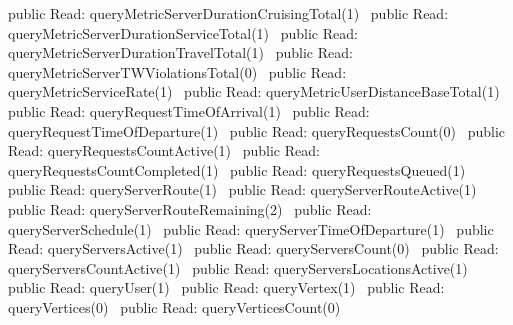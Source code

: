 public \LA{}Read: queryMetricServerDurationCruisingTotal(1)~{\nwtagstyle{}}\RA{}
public \LA{}Read: queryMetricServerDurationServiceTotal(1)~{\nwtagstyle{}}\RA{}
public \LA{}Read: queryMetricServerDurationTravelTotal(1)~{\nwtagstyle{}}\RA{}
public \LA{}Read: queryMetricServerTWViolationsTotal(0)~{\nwtagstyle{}}\RA{}
public \LA{}Read: queryMetricServiceRate(1)~{\nwtagstyle{}}\RA{}
public \LA{}Read: queryMetricUserDistanceBaseTotal(1)~{\nwtagstyle{}}\RA{}
public \LA{}Read: queryRequestTimeOfArrival(1)~{\nwtagstyle{}}\RA{}
public \LA{}Read: queryRequestTimeOfDeparture(1)~{\nwtagstyle{}}\RA{}
public \LA{}Read: queryRequestsCount(0)~{\nwtagstyle{}}\RA{}
public \LA{}Read: queryRequestsCountActive(1)~{\nwtagstyle{}}\RA{}
public \LA{}Read: queryRequestsCountCompleted(1)~{\nwtagstyle{}}\RA{}
public \LA{}Read: queryRequestsQueued(1)~{\nwtagstyle{}}\RA{}
public \LA{}Read: queryServerRoute(1)~{\nwtagstyle{}}\RA{}
public \LA{}Read: queryServerRouteActive(1)~{\nwtagstyle{}}\RA{}
public \LA{}Read: queryServerRouteRemaining(2)~{\nwtagstyle{}}\RA{}
public \LA{}Read: queryServerSchedule(1)~{\nwtagstyle{}}\RA{}
public \LA{}Read: queryServerTimeOfDeparture(1)~{\nwtagstyle{}}\RA{}
public \LA{}Read: queryServersActive(1)~{\nwtagstyle{}}\RA{}
public \LA{}Read: queryServersCount(0)~{\nwtagstyle{}}\RA{}
public \LA{}Read: queryServersCountActive(1)~{\nwtagstyle{}}\RA{}
public \LA{}Read: queryServersLocationsActive(1)~{\nwtagstyle{}}\RA{}
public \LA{}Read: queryUser(1)~{\nwtagstyle{}}\RA{}
public \LA{}Read: queryVertex(1)~{\nwtagstyle{}}\RA{}
public \LA{}Read: queryVertices(0)~{\nwtagstyle{}}\RA{}
public \LA{}Read: queryVerticesCount(0)~{\nwtagstyle{}}\RA{}
\nwendcode{}\nwdocspar
{}
\nwenddocs{}\plusendmoddef
